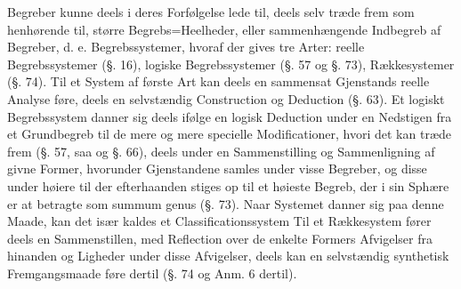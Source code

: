 \documentclass[12pt]{book}
\def\textit#1{#1}%
\def\emph#1{#1}%
\newcommand{\opage}[1]{\marginnote{\footnotesize\textit{[#1]}}}
\begin{document}
Begreber kunne deels i deres Forfølgelse lede til, deels selv træde frem som
henhørende til, større Begrebs=Heelheder, eller sammenhængende Indbegreb af Begreber,
d. e. Begrebssystemer, hvoraf der gives tre Arter: \emph{reelle Begrebssystemer}
(§. 16), \emph{logiske Begrebssystemer} (§. 57 og §. 73), \emph{Rækkesystemer}
(§. 74). Til et System af første Art kan deels en sammensat Gjenstands reelle Analyse
føre, deels en selvstændig Construction og Deduction (§. 63). Et logiskt Begrebssystem
danner sig deels ifølge en logisk Deduction under en Nedstigen fra et Grundbegreb til
de mere og mere specielle Modificationer, hvori det kan træde frem (§. 57, saa og
§. 66), deels under en Sammenstilling og Sammenligning af givne Former, hvorunder
\opage{245}Gjenstandene samles under visse Begreber, og disse under høiere til der efterhaanden
stiges op til et høieste Begreb, der i sin Sphære er at betragte som
\textit{summum genus} (§. 73). Naar Systemet danner sig paa denne Maade, kan det især
kaldes et \emph{Classificationssystem} Til et Rækkesystem fører deels en
Sammenstillen, med Reflection over de enkelte Formers Afvigelser fra hinanden og
Ligheder under disse Afvigelser, deels kan en selvstændig synthetisk Fremgangsmaade
føre dertil (§. 74 og Anm. 6 dertil).
\end{document}
